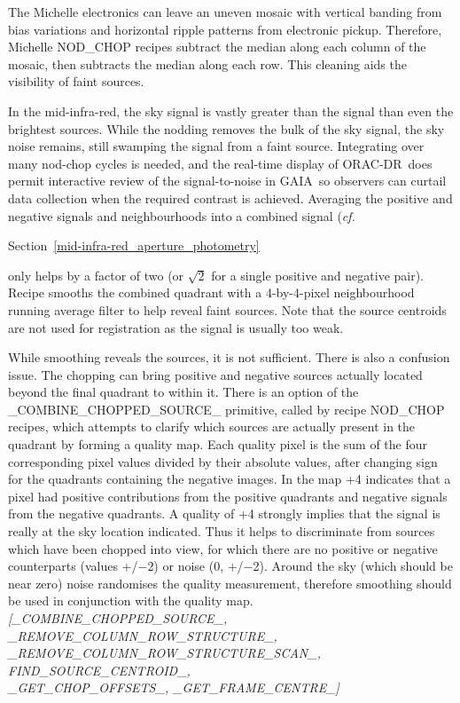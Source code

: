 \documentclass[twoside,11pt,nolof]{starlink}
\providecommand{\GAIA}{{\footnotesize GAIA}}
\providecommand{\ORACDR}{{\footnotesize ORAC-DR}}
\begin{document}
The Michelle electronics can leave an uneven mosaic with vertical
banding from bias variations and horizontal ripple patterns from
electronic pickup.  Therefore, Michelle NOD\_CHOP recipes subtract the
median along each column of the mosaic, then subtracts the median
along each row.  This cleaning aids the visibility of faint sources.

In the mid-infra-red, the sky signal is vastly greater than the signal
than even the brightest sources.  While the nodding removes the bulk
of the sky signal, the sky noise remains, still swamping the signal
from a faint source.  Integrating over many nod-chop cycles is needed,
and the real-time display of \ORACDR\ does permit interactive review
of the signal-to-noise in \GAIA\ so observers can curtail data collection
when the required contrast is achieved.  Averaging the positive and
negative signals and neighbourhoods into a combined signal (\emph{{cf.}}\
\begin{latexonly}
Section~\ref{mid-infra-red_aperture_photometry}
\end{latexonly}


only helps by a factor of two (or $\sqrt{2}$ for a single positive and
negative pair).  Recipe \htmlref{NOD\_CHOP\_FAINT}{NOD\_CHOP\_FAINT}
smooths the combined quadrant with a 4-by-4-pixel neighbourhood
running average filter to help reveal faint sources.  Note that the
source centroids are not used for registration as the signal is
usually too weak.

While smoothing reveals the sources, it is not sufficient. There is
also a confusion issue.  The chopping can bring positive and negative
sources actually located beyond the final quadrant to within it.
There is an option of the \_COMBINE\_CHOPPED\_SOURCE\_ primitive,
called by recipe NOD\_CHOP recipes, which attempts to clarify which
sources are actually present in the quadrant by forming a quality map.
Each quality pixel is the sum of the four corresponding pixel values
divided by their absolute values, after changing sign for the
quadrants containing the negative images.  In the map +4 indicates
that a pixel had positive contributions from the positive quadrants
and negative signals from the negative quadrants.  A quality of +4
strongly implies that the signal is really at the sky location
indicated.  Thus it helps to discriminate from sources which have been
chopped into view, for which there are no positive or negative
counterparts (values +/$-$2) or noise (0, +/$-$2).  Around the sky (which
should be near zero) noise randomises the quality measurement,
therefore smoothing should be used in conjunction with the quality
map.
\newline \emph{[\_COMBINE\_CHOPPED\_SOURCE\_, \_REMOVE\_COLUMN\_ROW\_STRUCTURE\_,\\
\_REMOVE\_COLUMN\_ROW\_STRUCTURE\_SCAN\_, FIND\_SOURCE\_CENTROID\_,\\
\_GET\_CHOP\_OFFSETS\_, \_GET\_FRAME\_CENTRE\_]}
\end{document}
